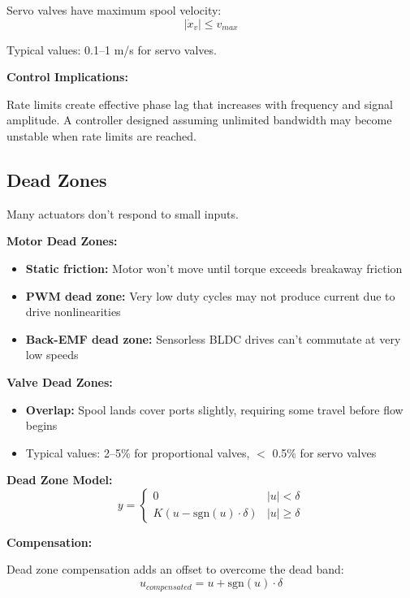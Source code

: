Servo valves have maximum spool velocity:
\begin{equation}
    |\dot{x}_v| \leq v_{max}
\end{equation}

Typical values: 0.1--1 m/s for servo valves.

\textbf{Control Implications:}

Rate limits create effective phase lag that increases with frequency and signal amplitude. A controller designed assuming unlimited bandwidth may become unstable when rate limits are reached.

\subsection{Dead Zones}

Many actuators don't respond to small inputs.

\textbf{Motor Dead Zones:}
\begin{itemize}
    \item \textbf{Static friction:} Motor won't move until torque exceeds breakaway friction
    \item \textbf{PWM dead zone:} Very low duty cycles may not produce current due to drive nonlinearities
    \item \textbf{Back-EMF dead zone:} Sensorless BLDC drives can't commutate at very low speeds
\end{itemize}

\textbf{Valve Dead Zones:}
\begin{itemize}
    \item \textbf{Overlap:} Spool lands cover ports slightly, requiring some travel before flow begins
    \item Typical values: 2--5\% for proportional valves, $<$ 0.5\% for servo valves
\end{itemize}

\textbf{Dead Zone Model:}
\begin{equation}
    y = \begin{cases}
        0 & |u| < \delta \\
        K(u - \text{sgn}(u) \cdot \delta) & |u| \geq \delta
    \end{cases}
\end{equation}

\textbf{Compensation:}

Dead zone compensation adds an offset to overcome the dead band:
\begin{equation}
    u_{compensated} = u + \text{sgn}(u) \cdot \delta
\end{equation}

